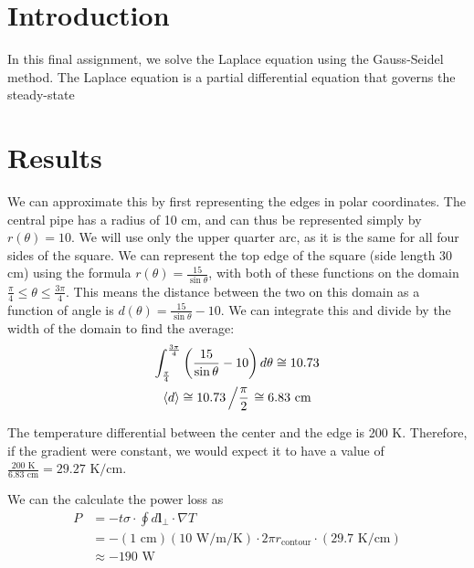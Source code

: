 \documentclass{article}
\author{\hwauthor}
\title{\hwtitle}
\date{\hwdate}
\begin{document}
\maketitle
\thispagestyle{fancy}

\section{Introduction}

In this final assignment, we solve the Laplace equation using the Gauss-Seidel method. The Laplace equation is a partial differential equation that governs the steady-state

\section{Results}

\bigskip
{}
\medskip

We can approximate this by first representing the edges in polar coordinates. The central pipe has a radius of 10 cm, and can thus be represented simply by $r(\theta) = 10$. We will use only the upper quarter arc, as it is the same for all four sides of the square. We can represent the top edge of the square (side length 30 cm) using the formula $r(\theta)=\frac{15}{\sin\theta}$, with both of these functions on the domain $\frac{\pi}{4}\leq \theta \leq \frac{3\pi}{4}$. This means the distance between the two on this domain as a function of angle is $d(\theta)=\frac{15}{\sin\theta}-10$. We can integrate this and divide by the width of the domain to find the average: \begin{gather*}
    \int_{\pi\over 4}^{3\pi\over 4} \left(\frac{15}{\sin\theta}-10\right)d\theta \cong 10.73 \\
    \langle d \rangle \cong 10.73\left/\frac{\pi}{2}\right. \cong 6.83\text{ cm}
\end{gather*}

The temperature differential between the center and the edge is 200 K. Therefore, if the gradient were constant, we would expect it to have a value of $\displaystyle \frac{200\text{ K}}{6.83\text{ cm}}=29.27\text{ K/cm}$.

We can the calculate the power loss as \begin{align*}
    P &= -t\sigma \cdot \oint d\mathbf{l}_\perp \cdot \nabla T \\
    &= -(1\text{ cm})(10\text{ W/m/K}) \cdot 2\pi r_\text{contour} \cdot (29.7\text{ K/cm}) \\
    &\approx \boxed{-190\text{ W}}
\end{align*}
\end{document}
